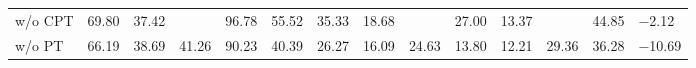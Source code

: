 \begin{table}[t]
\begin{threeparttable}
\begin{adjustbox}{max width=\textwidth}
\begin{tabular}{
        l
        Y Y Y Y Y Y Y Y Y Y Y Y Z
    }
    \addlinespace[1pt]

    w/o CPT
    & \num{69.80}
    & 37.42
    & {}
    & \num{96.78}
    & 55.52
    & 35.33
    & 18.68
    & {}
    & 27.00
    & 13.37
    & {}
    & \num{44.85}
    & \num{-2.12}
    \\

    \addlinespace[2pt]

    w/o PT
    & \num{66.19}
    & 38.69
    & 41.26
    & \num{90.23}
    & 40.39
    & 26.27
    & 16.09
    & 24.63
    & 13.80
    & 12.21
    & 29.36
    & \num{36.28}
    & \num{-10.69}
    \\

    \bottomrule[1.15pt]

    \end{tabular}
    \end{adjustbox}

    \end{threeparttable}
    \vspace{-0.4cm}
\end{table}